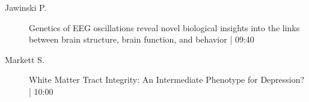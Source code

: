 \begin{symposium}
\begin{description}
                \item [ Jawinski P.] Genetics of EEG oscillations reveal novel biological insights into the links between brain structure, brain function, and behavior \textcolor{mygray}{ | 09:40}    
                
                \item [ Markett S.] White Matter Tract Integrity: An Intermediate Phenotype for Depression? \textcolor{mygray}{ | 10:00}    
                
            \end{description} 
            \end{symposium}
            